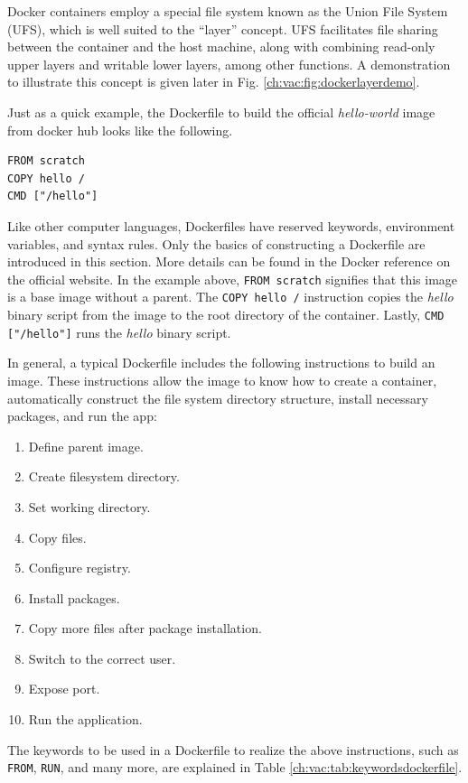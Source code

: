 Docker containers employ a special file system known as the Union File System (UFS), which is well suited to the ``layer'' concept. UFS facilitates file sharing between the container and the host machine, along with combining read-only upper layers and writable lower layers, among other functions. A demonstration to illustrate this concept is given later in Fig. \ref{ch:vac:fig:dockerlayerdemo}.

Just as a quick example, the Dockerfile to build the official \textit{hello-world} image from docker hub looks like the following.
\begin{lstlisting}
FROM scratch
COPY hello /
CMD ["/hello"]
\end{lstlisting}
Like other computer languages, Dockerfiles have reserved keywords, environment variables, and syntax rules. Only the basics of constructing a Dockerfile are introduced in this section. More details can be found in the Docker reference on the official website. In the example above, \verb|FROM scratch| signifies that this image is a base image without a parent. The \verb|COPY hello /| instruction copies the \textit{hello} binary script from the image to the root directory of the container. Lastly, \verb|CMD ["/hello"]| runs the \textit{hello} binary script.

In general, a typical Dockerfile includes the following instructions to build an image. These instructions allow the image to know how to create a container, automatically construct the file system directory structure, install necessary packages, and run the app:
\begin{enumerate}[(1)]
  \item Define parent image.
  \item Create filesystem directory.
  \item Set working directory.
  \item Copy files.
  \item Configure registry.
  \item Install packages.
  \item Copy more files after package installation.
  \item Switch to the correct user.
  \item Expose port.
  \item Run the application.
\end{enumerate}

The keywords to be used in a Dockerfile to realize the above instructions, such as \verb|FROM|, \verb|RUN|, and many more, are explained in Table \ref{ch:vac:tab:keywordsdockerfile}. 


